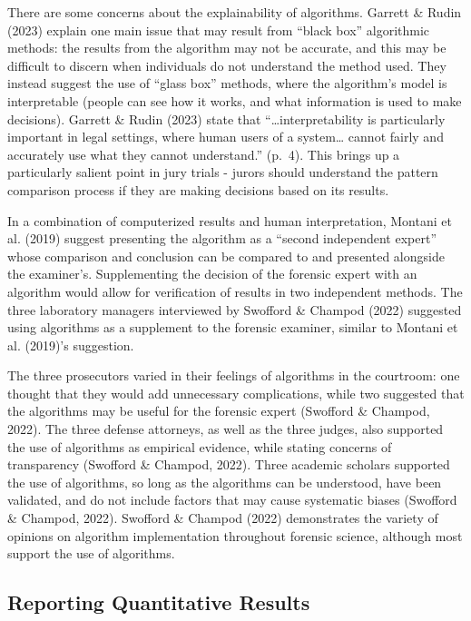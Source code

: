 \documentclass[print]{nuthesis}
\begin{document}
There are some concerns about the explainability of algorithms.
Garrett \& Rudin (2023) explain one main issue that may result from ``black box'' algorithmic methods: the results from the algorithm may not be accurate, and this may be difficult to discern when individuals do not understand the method used.
They instead suggest the use of ``glass box'' methods, where the algorithm's model is interpretable (people can see how it works, and what information is used to make decisions).
Garrett \& Rudin (2023) state that ``\ldots interpretability is particularly important in legal settings, where human users of a system\ldots{} cannot fairly and accurately use what they cannot understand.'' (p.~4).
This brings up a particularly salient point in jury trials - jurors should understand the pattern comparison process if they are making decisions based on its results.

In a combination of computerized results and human interpretation, Montani et al. (2019) suggest presenting the algorithm as a ``second independent expert'' whose comparison and conclusion can be compared to and presented alongside the examiner's.
Supplementing the decision of the forensic expert with an algorithm would allow for verification of results in two independent methods.
The three laboratory managers interviewed by Swofford \& Champod (2022) suggested using algorithms as a supplement to the forensic examiner, similar to Montani et al. (2019)'s suggestion.

The three prosecutors varied in their feelings of algorithms in the courtroom: one thought that they would add unnecessary complications, while two suggested that the algorithms may be useful for the forensic expert (Swofford \& Champod, 2022).
The three defense attorneys, as well as the three judges, also supported the use of algorithms as empirical evidence, while stating concerns of transparency (Swofford \& Champod, 2022).
Three academic scholars supported the use of algorithms, so long as the algorithms can be understood, have been validated, and do not include factors that may cause systematic biases (Swofford \& Champod, 2022).
Swofford \& Champod (2022) demonstrates the variety of opinions on algorithm implementation throughout forensic science, although most support the use of algorithms.

\hypertarget{reporting-quantitative-results}{%
\subsection{Reporting Quantitative Results}\label{reporting-quantitative-results}}
\end{document}
